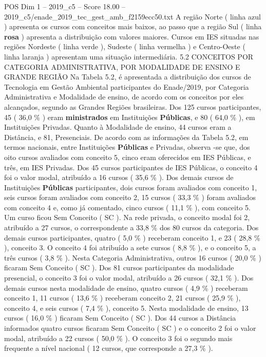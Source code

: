 \begin{textsample}{POS Dim 1 – 2019\_c5 – Score 18.00 – 2019\_c5/enade\_2019\_tec\_gest\_amb\_f2159ecc50.txt}
A região Norte ( linha azul ) apresenta os cursos com conceitos mais baixos, ao passo que a região Sul ( linha \textbf{rosa} ) apresenta a distribuição com valores maiores.
Cursos em IES situadas nas regiões Nordeste ( linha verde ), Sudeste ( linha vermelha ) e Centro-Oeste ( linha laranja ) apresentam uma situação intermediária. 5.2 CONCEITOS POR CATEGORIA ADMINISTRATIVA, POR MODALIDADE DE ENSINO E GRANDE REGIÃO Na Tabela 5.2, é apresentada a distribuição dos cursos de Tecnologia em Gestão Ambiental participantes do Enade/2019, por Categoria Administrativa e Modalidade de ensino, de acordo com os conceitos por eles alcançados, segundo as Grandes Regiões brasileiras.
Dos 125 cursos participantes, 45 ( 36,0 \% ) eram \textbf{ministrados} em Instituições \textbf{Públicas}, e 80 ( 64,0 \% ), em Instituições Privadas.
Quanto à Modalidade de ensino, 44 cursos eram a Distância, e 81, Presenciais.
De acordo com as informações da Tabela 5.2, em termos nacionais, entre Instituições \textbf{Públicas} e Privadas, observa -se que, dos oito cursos avaliados com conceito 5, cinco eram oferecidos em IES Públicas, e três, em IES Privadas.
Dos 45 cursos participantes de IES Públicas, o conceito 4 foi o valor modal, atribuído a 16 cursos ( 35,6 \% ).
Dos demais cursos de Instituições \textbf{Públicas} participantes, dois cursos foram avaliados com conceito 1, seis cursos foram avaliados com conceito 2, 15 cursos ( 33,3 \% ) foram avaliados com conceito 4 e, como já comentado, cinco cursos ( 11,1 \% ), com conceito 5.
Um curso ficou Sem Conceito ( SC ).
Na rede privada, o conceito modal foi 2, atribuído a 27 cursos, o correspondente a 33,8 \% dos 80 cursos da categoria.
Dos demais cursos participantes, quatro ( 5,0 \% ) receberam conceito 1, e 23 ( 28,8 \% ), conceito 3.
O conceito 4 foi atribuído a sete cursos ( 8,8 \% ), e o conceito 5, a três cursos ( 3,8 \% ).
Nesta Categoria Administrativa, outros 16 cursos ( 20,0 \% ) ficaram Sem Conceito ( SC ).
Dos 81 cursos participantes da modalidade presencial, o conceito 3 foi o valor modal, atribuído a 26 cursos ( 32,1 \% ).
Dos demais cursos nesta modalidade de ensino, quatro cursos ( 4,9 \% ) receberam conceito 1, 11 cursos ( 13,6 \% ) receberam conceito 2, 21 cursos ( 25,9 \% ), conceito 4, e seis cursos ( 7,4 \% ), conceito 5.
Nesta modalidade de ensino, 13 cursos ( 16,0 \% ) ficaram Sem Conceito ( SC ).
Dos 44 cursos a Distância informados quatro cursos ficaram Sem Conceito ( SC ) e o conceito 2 foi o valor modal, atribuído a 22 cursos ( 50,0 \% ).
O conceito 3 foi o segundo mais frequente a nível nacional ( 12 cursos, que corresponde a 27,3 \% ).

\end{textsample}
